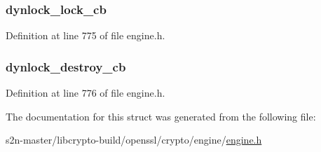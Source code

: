 \subsubsection[{\texorpdfstring{dynlock\+\_\+lock\+\_\+cb}{dynlock_lock_cb}}]{ dynlock\+\_\+lock\+\_\+cb}\hypertarget{structst__dynamic___l_o_c_k__fns_a6b4ba5634816ccd96b05fa15af4764df}{}\label{structst__dynamic___l_o_c_k__fns_a6b4ba5634816ccd96b05fa15af4764df}


Definition at line 775 of file engine.\+h.

\subsubsection[{\texorpdfstring{dynlock\+\_\+destroy\+\_\+cb}{dynlock_destroy_cb}}]{ dynlock\+\_\+destroy\+\_\+cb}\hypertarget{structst__dynamic___l_o_c_k__fns_ad7b64e475c483622cfa140300df33911}{}\label{structst__dynamic___l_o_c_k__fns_ad7b64e475c483622cfa140300df33911}


Definition at line 776 of file engine.\+h.



The documentation for this struct was generated from the following file\+:\begin{DoxyCompactItemize}
\item 
s2n-\/master/libcrypto-\/build/openssl/crypto/engine/\hyperlink{crypto_2engine_2engine_8h}{engine.\+h}\end{DoxyCompactItemize}
